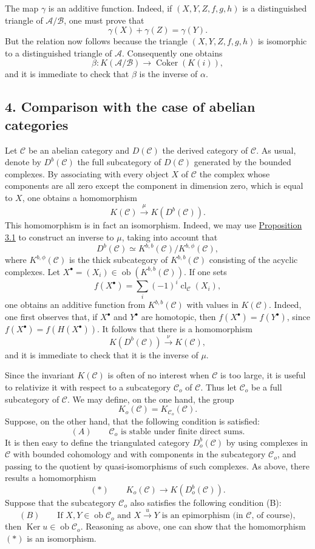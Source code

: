 \documentclass[11pt]{article}
\providecommand{\Ob}{\operatorname{ob}}
\providecommand{\cC}{\mathcal C}
\providecommand{\Ob}{\operatorname{ob}}
\providecommand{\cC}{\mathcal C}
\providecommand{\cA}{\mathcal A}
\providecommand{\cB}{\mathcal B}
\providecommand{\Ob}{\operatorname{Ob}}
\providecommand{\Ob}{\operatorname{ob}}
\providecommand{\Ob}{\operatorname{Ob}}
\begin{document}
The map $\gamma$ is an additive function. Indeed, if $(X,Y,Z,f,g,h)$ is a distinguished triangle of $\cA/\cB$, one must prove that
\[
\gamma(X)+\gamma(Z)=\gamma(Y).
\]
But the relation now follows because the triangle $(X,Y,Z,f,g,h)$ is isomorphic to a distinguished triangle of $\cA$. Consequently one obtains
\[
\beta:K(\cA/\cB)\longrightarrow \operatorname{Coker}(K(i)),
\]
and it is immediate to check that $\beta$ is the inverse of $\alpha$.

\subsection*{4. Comparison with the case of abelian categories}\label{sga5:VIII:subsection:4}

Let $\cC$ be an abelian category and $D(\cC)$ the derived category of $\cC$. As usual, denote by $D^b(\cC)$ the full subcategory of $D(\cC)$ generated by the bounded complexes. By associating with every object $X$ of $\cC$ the complex whose components are all zero except the component in dimension zero, which is equal to $X$, one obtains a homomorphism
\[
K(\cC)\xrightarrow{\mu}K(D^b(\cC)).
\]
This homomorphism is in fact an isomorphism. Indeed, we may use \hyperref[sga5:VIII:proposition:3.1]{Proposition 3.1} to construct an inverse to $\mu$, taking into account that
\[
D^b(\cC)\simeq K^{b,b}(\cC)/K^{b,\phi}(\cC),
\]
where $K^{b,\phi}(\cC)$ is the thick subcategory of $K^{b,b}(\cC)$ consisting of the acyclic complexes. Let $X^\bullet=(X_i)\in\Ob(K^{b,b}(\cC))$. If one sets
\[
f(X^\bullet)=\sum_i(-1)^i\operatorname{cl}_{\cC}(X_i),
\]
one obtains an additive function from $K^{b,b}(\cC)$ with values in $K(\cC)$. Indeed, one first observes that, if $X^\bullet$ and $Y^\bullet$ are homotopic, then $f(X^\bullet)=f(Y^\bullet)$, since $f(X^\bullet)=f(H(X^\bullet))$. It follows that there is a homomorphism
\[
K(D^b(\cC))\xrightarrow{\nu}K(\cC),
\]
and it is immediate to check that it is the inverse of $\mu$.

Since the invariant $K(\cC)$ is often of no interest when $\cC$ is too large, it is useful to relativize it with respect to a subcategory $\cC_o$ of $\cC$. Thus let $\cC_o$ be a full subcategory of $\cC$. We may define, on the one hand, the group
\[
K_o(\cC)=K_{\cC_o}(\cC).
\]
Suppose, on the other hand, that the following condition is satisfied:
\[
(A)\qquad \cC_o\text{ is stable under finite direct sums.}
\]
It is then easy to define the triangulated category $D_o^b(\cC)$ by using complexes in $\cC$ with bounded cohomology and with components in the subcategory $\cC_o$, and passing to the quotient by quasi-isomorphisms of such complexes. As above, there results a homomorphism
\[
(*)\qquad K_o(\cC)\longrightarrow K(D_o^b(\cC)).
\]
Suppose that the subcategory $\cC_o$ also satisfies the following condition (B):
\[
(B)\qquad
\text{If }X,Y\in\Ob\cC_o\text{ and }X\xrightarrow{u}Y
\text{ is an epimorphism (in }\cC\text{, of course)},
\]
then $\operatorname{Ker}u\in\Ob\cC_o$. Reasoning as above, one can show that the homomorphism $(*)$ is an isomorphism.
\end{document}
